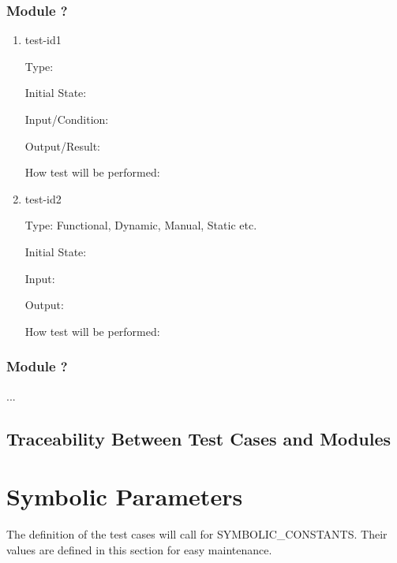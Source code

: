 \documentclass[12pt, titlepage]{article}
\begin{document}
\subsubsection{Module ?}
		
\begin{enumerate}

\item{test-id1\\}

Type: 
					
Initial State: 
					
Input/Condition: 
					
Output/Result: 
					
How test will be performed: 
					
\item{test-id2\\}

Type: Functional, Dynamic, Manual, Static etc.
					
Initial State: 
					
Input: 
					
Output: 
					
How test will be performed: 

\end{enumerate}

\subsubsection{Module ?}

...

\subsection{Traceability Between Test Cases and Modules}

\fi

\newpage
\nocite{*}



\newpage

\appendix
\section{Symbolic Parameters}

The definition of the test cases will call for SYMBOLIC\_CONSTANTS.
Their values are defined in this section for easy maintenance.\\
\end{document}

